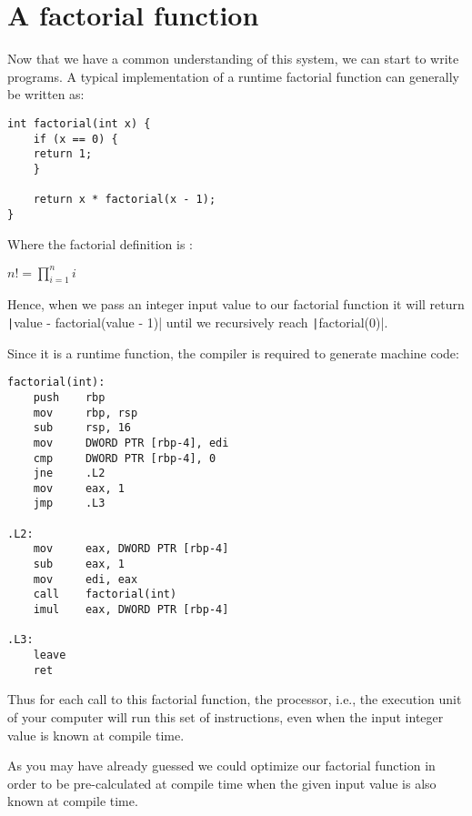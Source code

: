 \section*{A factorial function}

Now that we have a common understanding of this system, we can start to write programs. A typical implementation of a runtime factorial function can generally be written as:

\begin{verbatim}
int factorial(int x) {
    if (x == 0) {
	return 1;
    }

    return x * factorial(x - 1);
}
\end{verbatim}

Where the factorial definition is :
\begin{center}
	$\displaystyle n! = \prod_{i=1}^{n}i$
\end{center}

Hence, when we pass an integer input value to our factorial function it will return
\texttt|value - factorial(value - 1)| until we recursively reach \texttt|factorial(0)|.

\hrulefill

\begin{paracol}{2}
Since it is a runtime function, the compiler is required to generate machine code:
\begin{verbatim}
factorial(int):
    push    rbp
    mov     rbp, rsp
    sub     rsp, 16
    mov     DWORD PTR [rbp-4], edi
    cmp     DWORD PTR [rbp-4], 0
    jne     .L2
    mov     eax, 1
    jmp     .L3

.L2:
	mov     eax, DWORD PTR [rbp-4]
	sub     eax, 1
	mov     edi, eax
	call    factorial(int)
	imul    eax, DWORD PTR [rbp-4]

.L3:
	leave
	ret
\end{verbatim}

\switchcolumn
Thus for each call to this factorial function, the processor, i.e., the execution unit of your computer will run this set of instructions, even when the input integer value is known at compile time. 

As you may have already guessed we could optimize our factorial function in order to be pre-calculated at compile time when the given input value is also known at compile time.
\end{paracol}

